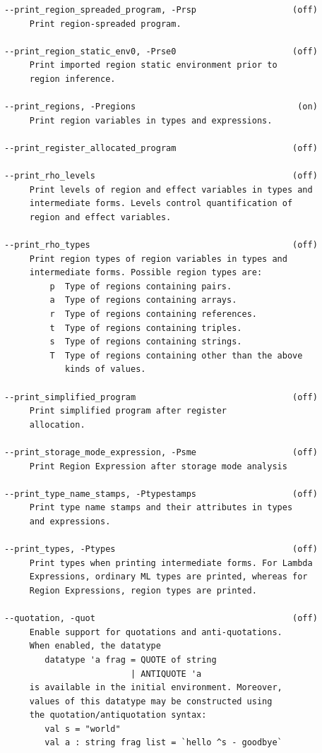 \documentclass[12pt]{book}
\begin{document}
\begin{verbatim}
--print_region_spreaded_program, -Prsp                   (off)
     Print region-spreaded program.

--print_region_static_env0, -Prse0                       (off)
     Print imported region static environment prior to
     region inference.

--print_regions, -Pregions                                (on)
     Print region variables in types and expressions.

--print_register_allocated_program                       (off)

--print_rho_levels                                       (off)
     Print levels of region and effect variables in types and
     intermediate forms. Levels control quantification of
     region and effect variables.

--print_rho_types                                        (off)
     Print region types of region variables in types and
     intermediate forms. Possible region types are:
         p  Type of regions containing pairs.
         a  Type of regions containing arrays.
         r  Type of regions containing references.
         t  Type of regions containing triples.
         s  Type of regions containing strings.
         T  Type of regions containing other than the above
            kinds of values.

--print_simplified_program                               (off)
     Print simplified program after register
     allocation.

--print_storage_mode_expression, -Psme                   (off)
     Print Region Expression after storage mode analysis

--print_type_name_stamps, -Ptypestamps                   (off)
     Print type name stamps and their attributes in types
     and expressions.

--print_types, -Ptypes                                   (off)
     Print types when printing intermediate forms. For Lambda
     Expressions, ordinary ML types are printed, whereas for
     Region Expressions, region types are printed.

--quotation, -quot                                       (off)
     Enable support for quotations and anti-quotations.
     When enabled, the datatype
        datatype 'a frag = QUOTE of string
                         | ANTIQUOTE 'a
     is available in the initial environment. Moreover,
     values of this datatype may be constructed using
     the quotation/antiquotation syntax:
        val s = "world"
        val a : string frag list = `hello ^s - goodbye`


\end{verbatim}
\end{document}
